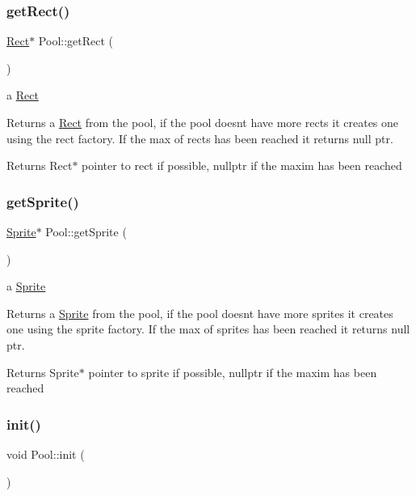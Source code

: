 \subsubsection{\texorpdfstring{get\+Rect()}{getRect()}}
{\footnotesize\ttfamily \hyperlink{class_rect}{Rect}$\ast$ Pool\+::get\+Rect (\begin{DoxyParamCaption}{ }\end{DoxyParamCaption})}

a \hyperlink{class_rect}{Rect}

Returns a \hyperlink{class_rect}{Rect} from the pool, if the pool doesn\textquotesingle{}t have more rects it creates one using the rect factory. If the max of rects has been reached it returns null ptr.

\begin{DoxyReturn}{Returns}
Rect$\ast$ pointer to rect if possible, nullptr if the maxim has been reached 
\end{DoxyReturn}
\mbox{\label{class_pool_abd15708186d45b2e45312c872dd84384}} 
\subsubsection{\texorpdfstring{get\+Sprite()}{getSprite()}}
{\footnotesize\ttfamily \hyperlink{class_sprite}{Sprite}$\ast$ Pool\+::get\+Sprite (\begin{DoxyParamCaption}{ }\end{DoxyParamCaption})}

a \hyperlink{class_sprite}{Sprite}

Returns a \hyperlink{class_sprite}{Sprite} from the pool, if the pool doesn\textquotesingle{}t have more sprites it creates one using the sprite factory. If the max of sprites has been reached it returns null ptr.

\begin{DoxyReturn}{Returns}
Sprite$\ast$ pointer to sprite if possible, nullptr if the maxim has been reached 
\end{DoxyReturn}
\mbox{\label{class_pool_a7b5bfb074b19ea0169edf7c2d73b2f6e}} 
\subsubsection{\texorpdfstring{init()}{init()}}
{\footnotesize\ttfamily void Pool\+::init (\begin{DoxyParamCaption}{ }\end{DoxyParamCaption})}

